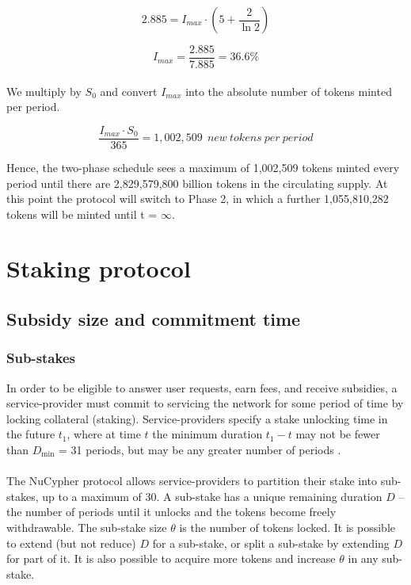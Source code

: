 \documentclass[longbibliography,nofootinbib]{revtex4-1}
\begin{document}
\begin{equation}
    2.885 = I_{max} \cdot (5 + \frac{2}{\ln{2}})
\end{equation}

\begin{equation}
   I_{max} = \frac{2.885}{7.885} = 36.6\%
\end{equation}
\\
We multiply by $S_0$ and convert $I_{max}$ into the absolute number of tokens minted per period.

\begin{equation}
    \label{eq:abs}
   \frac{I_{max} \cdot S_0}{365} = 1,002,509\:\:new \:tokens \:per \:period
\end{equation}

Hence, the two-phase schedule sees a maximum of 1,002,509 tokens minted every period until there are 2,829,579,800 billion tokens in the circulating supply. At this point the protocol will switch to Phase 2, in which a further 1,055,810,282 tokens will be minted until t = $\infty$.


\section{Staking protocol}

\subsection{Subsidy size and commitment time}

\subsubsection{Sub-stakes}

In order to be eligible to answer user requests, earn fees, and receive subsidies, a service-provider must commit to servicing the network for some period of time by locking collateral (staking). Service-providers specify a stake unlocking time in the future $t_1$, where at time $t$ the minimum duration $t_1 - t$ may not be fewer than $D_{\min}$ = 31 periods, but may be any greater number of periods .
\\\\
The NuCypher protocol allows service-providers to partition their stake into sub-stakes, up to a maximum of 30. A sub-stake has a unique remaining duration $D$ – the number of periods until it unlocks and the tokens become freely withdrawable. The sub-stake size $\theta$ is the number of tokens locked. It is possible to extend (but not reduce) $D$ for a sub-stake, or split a sub-stake by extending $D$ for part of it. It is also possible to acquire more tokens and increase $\theta$ in any sub-stake.
\end{document}
